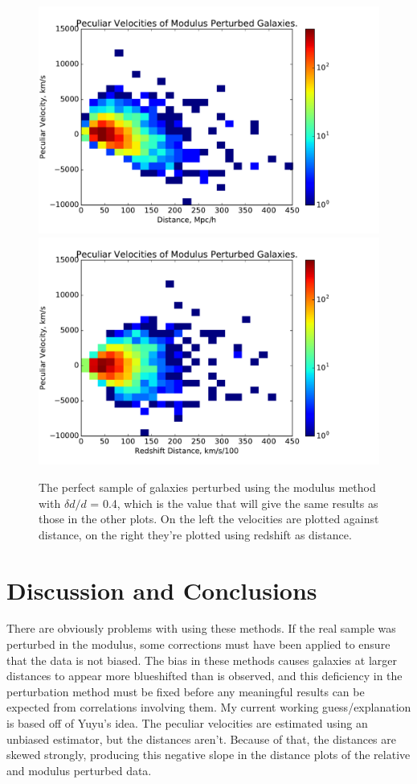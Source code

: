 \documentclass[usenatbib]{mn2e}
\begin{document}
\begin{figure}
\centering
\includegraphics[scale=0.35]{modulus}
\hfill
\includegraphics[scale=0.35]{modulusred}
\caption{\small The perfect sample of galaxies perturbed using the modulus method with $\delta d/d$ = 0.4, which is the value that will give the same results as those in the other plots. On the left the velocities are plotted against distance, on the right they're plotted using redshift as distance.}
\label{fig:modulus}
\end{figure}




\section{Discussion and Conclusions}
There are obviously problems with using these methods. If the real sample was perturbed in the modulus, some corrections must have been applied to ensure that the data is not biased. The bias in these methods causes galaxies at larger distances to appear more blueshifted than is observed, and this deficiency in the perturbation method must be fixed before any meaningful results can be expected from correlations involving them. My current working guess/explanation is based off of Yuyu's idea. The peculiar velocities are estimated using an unbiased estimator, but the distances aren't. Because of that, the distances are skewed strongly, producing this negative slope in the distance plots of the relative and modulus perturbed data.
\end{document}
